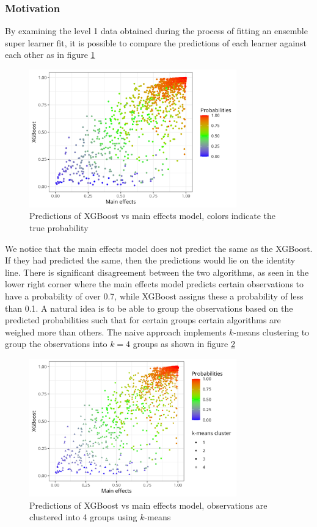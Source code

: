 \documentclass[./main.tex]{subfiles}
\begin{document}
\subsubsection{Motivation}
By examining the level 1 data obtained during the process of fitting an ensemble super learner fit, it is possible to compare the predictions of each learner against each other as in figure \ref{fig:esl_preds_xgboost_vs_main}
\begin{figure}[H]
    \centering
    \includegraphics[width=0.8\textwidth]{figures/esl_preds_xgboost_vs_main.png}
    \caption{Predictions of XGBoost vs main effects model, colors indicate the true probability}
    \label{fig:esl_preds_xgboost_vs_main}
\end{figure}
We notice that the main effects model does not predict the same as the XGBoost. If they had predicted the same, then the predictions would lie on the identity line. There is significant disagreement between the two algorithms, as seen in the lower right corner where the main effects model predicts certain observations to have a probability of over 0.7, while XGBoost assigns these a probability of less than 0.1. A natural idea is to be able to group the observations based on the predicted probabilities such that for certain groups certain algorithms are weighed more than others. The naive approach implements $ k $-means clustering to group the observations into $ k = 4 $ groups as shown in figure \ref{fig:esl_preds_xgboost_vs_main_kmeans} 
\begin{figure}[H]
    \centering
    \includegraphics[width=0.8\textwidth]{figures/esl_preds_xgboost_vs_main_kmeans.png}
    \caption{Predictions of XGBoost vs main effects model, observations are clustered into 4 groups using $ k $-means}
    \label{fig:esl_preds_xgboost_vs_main_kmeans}
\end{figure}
\end{document}
